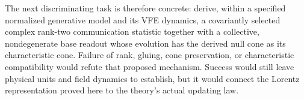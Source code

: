 The next discriminating task is therefore concrete: derive, within a specified normalized generative model and its VFE dynamics, a covariantly selected complex rank-two communication statistic together with a collective, nondegenerate base readout whose evolution has the derived null cone as its characteristic cone. Failure of rank, gluing, cone preservation, or characteristic compatibility would refute that proposed mechanism. Success would still leave physical units and field dynamics to establish, but it would connect the Lorentz representation proved here to the theory's actual updating law.
